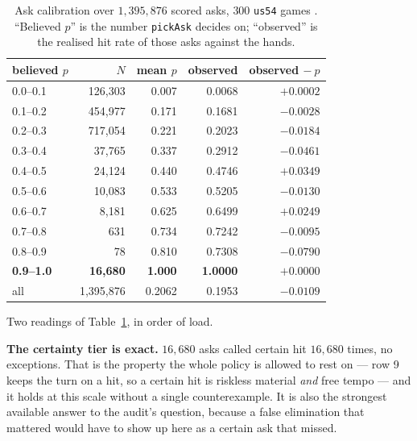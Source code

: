\documentclass[11pt]{article}
\newcommand{\code}[1]{\texttt{#1}}
\newcommand{\usff}{\code{us54}}
\begin{document}
\begin{table}[ht]
\centering
\caption{Ask calibration over $1{,}395{,}876$ scored asks, $300$ \usff{} games
\cite{asking}. ``Believed $p$'' is the number \code{pickAsk} decides on; ``observed'' is
the realised hit rate of those asks against the hands.}
\label{tab:calibration}
\small
\begin{tabular}{@{}lrrrr@{}}
\toprule
believed $p$ & $N$ & mean $p$ & observed & observed $-\ p$ \\
\midrule
0.0--0.1 & 126{,}303 & 0.007 & 0.0068 & $+0.0002$ \\
0.1--0.2 & 454{,}977 & 0.171 & 0.1681 & $-0.0028$ \\
0.2--0.3 & 717{,}054 & 0.221 & 0.2023 & $-0.0184$ \\
0.3--0.4 & 37{,}765  & 0.337 & 0.2912 & $-0.0461$ \\
0.4--0.5 & 24{,}124  & 0.440 & 0.4746 & $+0.0349$ \\
0.5--0.6 & 10{,}083  & 0.533 & 0.5205 & $-0.0130$ \\
0.6--0.7 & 8{,}181   & 0.625 & 0.6499 & $+0.0249$ \\
0.7--0.8 & 631       & 0.734 & 0.7242 & $-0.0095$ \\
0.8--0.9 & 78        & 0.810 & 0.7308 & $-0.0790$ \\
\textbf{0.9--1.0} & \textbf{16{,}680} & \textbf{1.000} & \textbf{1.0000}
  & $\mathbf{+0.0000}$ \\
\midrule
all & 1{,}395{,}876 & 0.2062 & 0.1953 & $-0.0109$ \\
\bottomrule
\end{tabular}
\end{table}

Two readings of Table~\ref{tab:calibration}, in order of load.

\textbf{The certainty tier is exact.} $16{,}680$ asks called certain hit $16{,}680$ times,
no exceptions. That is the property the whole policy is allowed to rest on --- row 9 keeps
the turn on a hit, so a certain hit is riskless material \emph{and} free tempo --- and it
holds at this scale without a single counterexample. It is also the strongest available
answer to the audit's question, because a false elimination that mattered would have to
show up here as a certain ask that missed.
\end{document}
